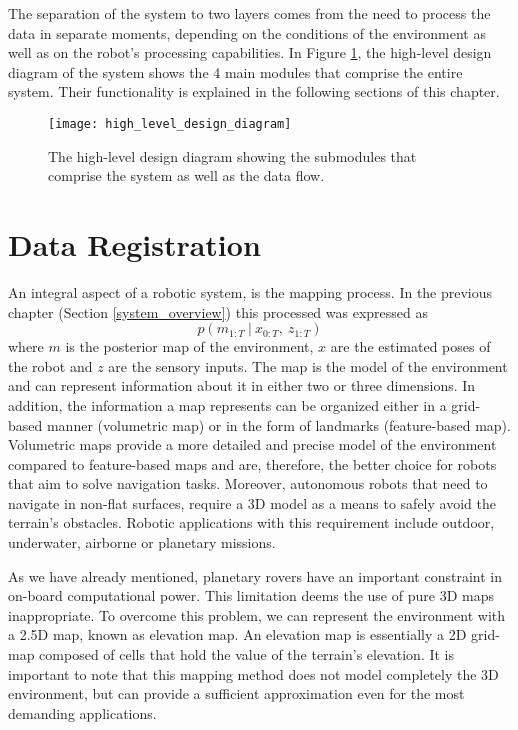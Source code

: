 The separation of the system to two layers comes from the need to process the
data in separate moments, depending on the conditions of the environment as
well as on the robot's processing capabilities.
In Figure \ref{fig:HLD}, the high-level design diagram of the system shows
the 4 main modules that comprise the entire system.
Their functionality is explained in the following sections of this chapter.

\begin{figure}
    \centering
    \texttt{[image: high\_level\_design\_diagram]}
    \decoRule
    \caption[High Level Design Diagram]{
        The high-level design diagram showing the submodules that comprise
        the system as well as the data flow.}
    \label{fig:HLD}
\end{figure}

\section{Data Registration}

An integral aspect of a robotic system, is the mapping process.
In the previous chapter (Section \ref{system_overview}) this processed
was expressed as
\begin{equation}
    p(m_{1:T} \ | \ x_{0:T} ,\ z_{1:T})
\end{equation}
where
$m$ is the posterior map of the environment,
$x$ are the estimated poses of the robot and
$z$ are the sensory inputs.
The map is the model of the environment and can represent information about
it in either two or three dimensions.
In addition, the information a map represents can be organized either in
a grid-based manner (volumetric map) or in the form of landmarks
(feature-based map).
Volumetric maps provide a more detailed and precise model of the environment
compared to feature-based maps and are, therefore, the better choice for
robots that aim to solve navigation tasks.
Moreover, autonomous robots that need to navigate in non-flat surfaces,
require a 3D model as a means to safely avoid the terrain's obstacles.
Robotic applications with this requirement include outdoor, underwater,
airborne or planetary missions.


As we have already mentioned, planetary rovers have an important constraint
in on-board computational power.
This limitation deems the use of pure 3D maps inappropriate.
To overcome this problem, we can represent the environment with a 2.5D map,
known as elevation map.
An elevation map is essentially a 2D grid-map composed of cells that hold
the value of the terrain's elevation.
It is important to note that this mapping method does not model completely
the 3D environment, but can provide a sufficient approximation even for
the most demanding applications.

